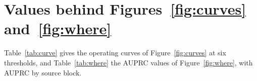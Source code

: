 \documentclass[11pt]{article}
\begin{document}
\section{\texorpdfstring{Values behind Figures~\ref{fig:curves} and~\ref{fig:where}}{Values behind Figures 2 and 3}}
\label{app:curve}
\label{app:where}

Table~\ref{tab:curve} gives the operating curves of Figure~\ref{fig:curves} at six thresholds, and
Table~\ref{tab:where} the AUPRC values of Figure~\ref{fig:where}, with AUPRC by source block.

\begin{table}[t]\centering\small
\setlength{\tabcolsep}{1.9pt}
\caption{Values behind Figure~\ref{fig:curves}: the three models' operating curves on all 437 rows,
three-checkpoint ensembles; Acc.\ is the share of the 437 candidates the model accepts at $\tau$. Rows show the shape; the reported operating points are those of
Table~\ref{tab:main}.}
\label{tab:curve}
\end{table}
\end{document}
